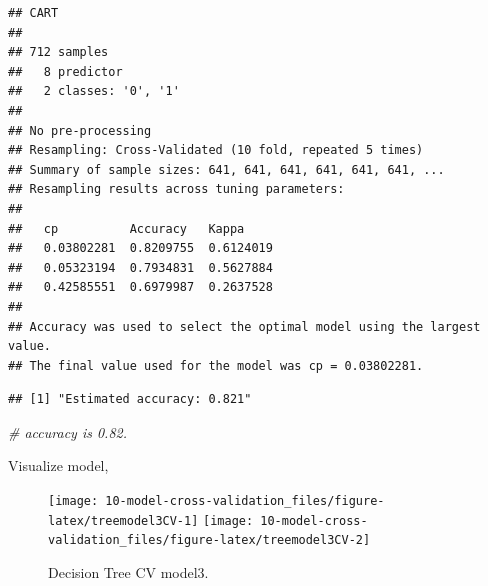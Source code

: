 \documentclass[
]{book}
\newenvironment{Shaded}{\begin{snugshade}}{\end{snugshade}}
\newcommand{\CommentTok}[1]{\textcolor[rgb]{0.56,0.35,0.01}{\textit{#1}}}
\newcommand{\DataTypeTok}[1]{\textcolor[rgb]{0.13,0.29,0.53}{#1}}
\newcommand{\DecValTok}[1]{\textcolor[rgb]{0.00,0.00,0.81}{#1}}
\newcommand{\KeywordTok}[1]{\textcolor[rgb]{0.13,0.29,0.53}{\textbf{#1}}}
\newcommand{\NormalTok}[1]{#1}
\newcommand{\OperatorTok}[1]{\textcolor[rgb]{0.81,0.36,0.00}{\textbf{#1}}}
\newcommand{\StringTok}[1]{\textcolor[rgb]{0.31,0.60,0.02}{#1}}
\begin{document}
\begin{verbatim}
## CART 
## 
## 712 samples
##   8 predictor
##   2 classes: '0', '1' 
## 
## No pre-processing
## Resampling: Cross-Validated (10 fold, repeated 5 times) 
## Summary of sample sizes: 641, 641, 641, 641, 641, 641, ... 
## Resampling results across tuning parameters:
## 
##   cp          Accuracy   Kappa    
##   0.03802281  0.8209755  0.6124019
##   0.05323194  0.7934831  0.5627884
##   0.42585551  0.6979987  0.2637528
## 
## Accuracy was used to select the optimal model using the largest value.
## The final value used for the model was cp = 0.03802281.
\end{verbatim}

\begin{Shaded}
\end{Shaded}

\begin{verbatim}
## [1] "Estimated accuracy: 0.821"
\end{verbatim}

\begin{Shaded}
\begin{Highlighting}[]
\CommentTok{# accuracy is 0.82.}
\end{Highlighting}
\end{Shaded}

Visualize model,

\begin{Shaded}
\end{Shaded}

\begin{figure}

{\centering \texttt{[image: 10-model-cross-validation\_files/figure-latex/treemodel3CV-1]} \texttt{[image: 10-model-cross-validation\_files/figure-latex/treemodel3CV-2]} 

}

\caption{Decision Tree CV model3.}\label{fig:treemodel3CV}
\end{figure}
\end{document}
